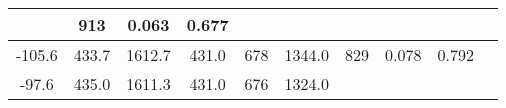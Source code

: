 \documentclass[a4paper,10pt]{article}
\begin{document}
\begin{longtable}{
     |
%    
    c|
%    
    c|
%    
    c|
%    
    c|
%    
    c|
%    
    c|
%    
    c|
%    
    c|
%    
    c|
%    
    c|
%    
    }
%        
        & 913
%        

%        

%        
        & 0.063
%        

%        

%        
        & 0.677
%        

%        
        \\
        \hline

        

%        

%        
        -105.6
%        

%        

%        
        & 433.7
%        

%        

%        
        & 1612.7
%        

%        

%        
        & 431.0
%        

%        

%        
        & 678
%        

%        

%        
        & 1344.0
%        

%        

%        
        & 829
%        

%        

%        
        & 0.078
%        

%        

%        
        & 0.792
%        

%        
        \\
        \hline

        

%        

%        
        -97.6
%        

%        

%        
        & 435.0
%        

%        

%        
        & 1611.3
%        

%        

%        
        & 431.0
%        

%        

%        
        & 676
%        

%        

%        
        & 1324.0
%        

%        


\end{longtable}
\end{document}
